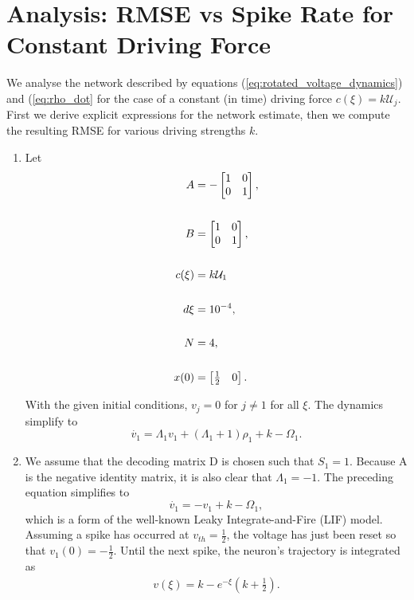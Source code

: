 \section{Analysis: RMSE vs Spike Rate for Constant Driving Force}




We analyse the network described by equations (\ref{eq:rotated_voltage_dynamics}) and (\ref{eq:rho_dot} for the case of a constant (in time) driving force $c(\xi) = k \mathcal{U}_j$. First we derive explicit expressions for the network estimate, then we compute the resulting RMSE for various driving strengths $k$.\\
\begin{enumerate}
\item Let 
\begin{align*}
A &= -\begin{bmatrix}  
1 & 0 \\
0 & 1
\end{bmatrix},\notag \\
\notag \\
B &= \begin{bmatrix}  
1 & 0 \\
0 & 1
\end{bmatrix}, \notag \\
\notag \\
c(\xi) &= k \mathcal{U}_1 \\
\notag \\
d\xi &= 10^{-4},\notag \\
\notag \\
N &= 4,\notag \\
\notag \\
x(0) &= \begin{bmatrix} \frac{1}{2} & 0 \end{bmatrix}.\notag 
\end{align*}

With the given initial conditions, $v_j = 0$ for $j \neq 1$ for all $\xi$. The dynamics simplify to 
\begin{equation*}
\label{eq:simple_voltage_dynamics_constant_driving}
\dot{v_1} = \Lambda_1 v_1 + (\Lambda_1 + 1)\rho_1 + k - \Omega_1.
\end{equation*}

\item We assume that the decoding matrix D is chosen such that $S_1 = 1$. Because A is the negative identity matrix, it is also clear that $\Lambda_1 = -1$. The preceding equation simplifies to  
\begin{equation}
\label{eq:simple_voltage_dynamics_constant_driving}
\dot{v_1} = -v_1 + k - \Omega_1,
\end{equation}
which is a form of the well-known Leaky Integrate-and-Fire (LIF) model. Assuming a spike has occurred at $v_{th} = \frac{1}{2}$, the voltage has just been reset so that $v_1(0) = -\frac{1}{2}$. Until the next spike, the neuron's trajectory is integrated as 
\begin{align*}
v(\xi) =  k - e^{-\xi} (k + \frac{1}{2}).
\end{align*}


\end{enumerate}
